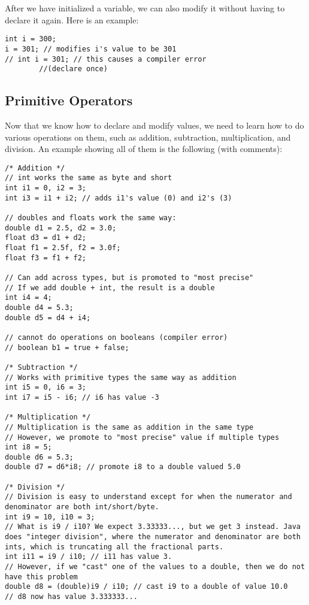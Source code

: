 \noindent After we have initialized a variable, we can also modify it without having to declare it again. Here is an example:
\begin{lstlisting}
int i = 300;
i = 301; // modifies i's value to be 301
// int i = 301; // this causes a compiler error 
		//(declare once)
\end{lstlisting}

\subsection{Primitive Operators}

\noindent Now that we know how to declare and modify values, we need to learn how to do various operations on them, such as addition, subtraction, multiplication, and division. An example showing all of them is the following (with comments):
\begin{lstlisting}
/* Addition */
// int works the same as byte and short
int i1 = 0, i2 = 3;
int i3 = i1 + i2; // adds i1's value (0) and i2's (3)

// doubles and floats work the same way:
double d1 = 2.5, d2 = 3.0;
float d3 = d1 + d2;
float f1 = 2.5f, f2 = 3.0f;
float f3 = f1 + f2;

// Can add across types, but is promoted to "most precise"
// If we add double + int, the result is a double
int i4 = 4;
double d4 = 5.3;
double d5 = d4 + i4;

// cannot do operations on booleans (compiler error)
// boolean b1 = true + false;

/* Subtraction */
// Works with primitive types the same way as addition
int i5 = 0, i6 = 3;
int i7 = i5 - i6; // i6 has value -3

/* Multiplication */
// Multiplication is the same as addition in the same type
// However, we promote to "most precise" value if multiple types
int i8 = 5;
double d6 = 5.3;
double d7 = d6*i8; // promote i8 to a double valued 5.0

/* Division */
// Division is easy to understand except for when the numerator and denominator are both int/short/byte.
int i9 = 10, i10 = 3;
// What is i9 / i10? We expect 3.33333..., but we get 3 instead. Java does "integer division", where the numerator and denominator are both ints, which is truncating all the fractional parts.
int i11 = i9 / i10; // i11 has value 3.
// However, if we "cast" one of the values to a double, then we do not have this problem
double d8 = (double)i9 / i10; // cast i9 to a double of value 10.0
// d8 now has value 3.333333...
\end{lstlisting}

